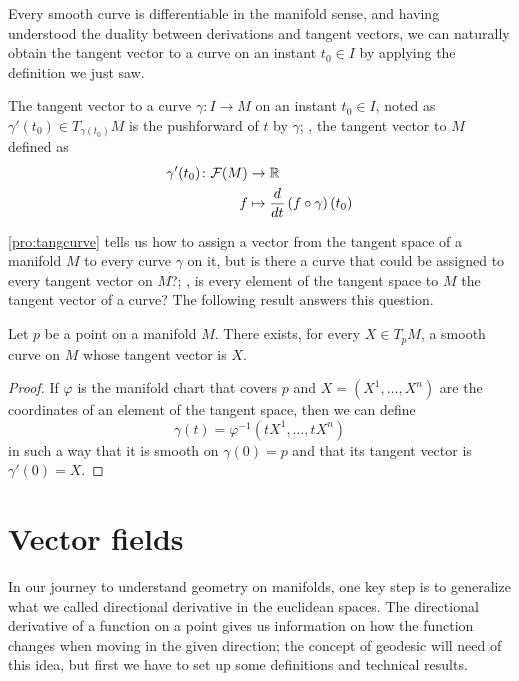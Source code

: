 Every smooth curve is differentiable in the manifold sense, and having understood the duality between derivations and tangent vectors, we can naturally obtain the tangent vector to a curve on an instant $t_0\in I$ by applying the definition we just saw.

\begin{proposition}
	\label{pro:tangcurve}
	The tangent vector to a curve $\gamma \colon I \to M$ on an instant $t_0 \in I$, noted as $\gamma'(t_0) \in T_{\gamma(t_0)} M$ is the pushforward of $t$ by $\gamma$; \ie, the tangent vector to $M$ defined as
	\begin{align*}
		\gamma'(t_0) \colon \mathcal{F}(M) &\to \mathbb{R} \\
		f &\mapsto \frac{d}{dt} \left( f \circ \gamma \right) (t_0)
	\end{align*}
\end{proposition}

\autoref{pro:tangcurve} tells us how to assign a vector from the tangent space of a manifold $M$ to every curve $\gamma$ on it, but is there a curve that could be assigned to every tangent vector on $M$?; \ie, is every element of the tangent space to $M$ the tangent vector of a curve? The following result answers this question.

\begin{theorem}
	Let $p$ be a point on a manifold $M$. There exists, for every $X \in T_p M$, a smooth curve on $M$ whose tangent vector is $X$.
\end{theorem}

\begin{proof}
	If $\varphi$ is the manifold chart that covers $p$ and $X = (X^1, \dots, X^n)$ are the coordinates of an element of the tangent space, then we can define
	\[
		\gamma(t) = \varphi^{-1}(tX^1, \dots, tX^n)
	\]
	in such a way that it is smooth on $\gamma(0) = p$ and that its tangent vector is $\gamma'(0) = X$.
\end{proof}

\section{Vector fields}

In our journey to understand geometry on manifolds, one key step is to generalize what we called directional derivative in the euclidean spaces. The directional derivative of a function on a point gives us information on how the function changes when moving in the given direction; the concept of geodesic will need of this idea, but first we have to set up some definitions and technical results.

